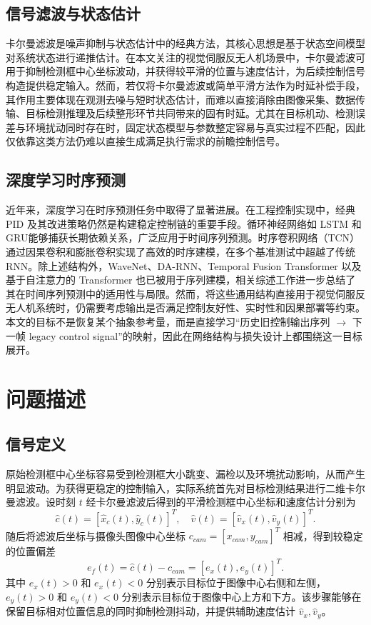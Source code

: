 \documentclass[journal]{IEEEtran}
\begin{document}
\subsection{信号滤波与状态估计}
卡尔曼滤波\cite{kalman1960new,welch1995introduction}是噪声抑制与状态估计中的经典方法，其核心思想是基于状态空间模型对系统状态进行递推估计。在本文关注的视觉伺服反无人机场景中，卡尔曼滤波可用于抑制检测框中心坐标波动，并获得较平滑的位置与速度估计，为后续控制信号构造提供稳定输入。然而，若仅将卡尔曼滤波或简单平滑方法作为时延补偿手段，其作用主要体现在观测去噪与短时状态估计，而难以直接消除由图像采集、数据传输、目标检测推理及后续整形环节共同带来的固有时延。尤其在目标机动、检测误差与环境扰动同时存在时，固定状态模型与参数整定容易与真实过程不匹配，因此仅依靠这类方法仍难以直接生成满足执行需求的前瞻控制信号。

\subsection{深度学习时序预测}
近年来，深度学习在时序预测任务中取得了显著进展\cite{lecun2015deep}。在工程控制实现中，经典 PID 及其改进策略仍然是构建稳定控制链的重要手段\cite{liu2003advancedpid}。循环神经网络如 LSTM\cite{hochreiter1997long} 和 GRU\cite{cho2014learning}能够捕获长期依赖关系，广泛应用于时间序列预测。时序卷积网络（TCN）\cite{bai2018empirical}通过因果卷积和膨胀卷积实现了高效的时序建模，在多个基准测试中超越了传统 RNN。除上述结构外，WaveNet\cite{oord2016wavenet}、DA-RNN\cite{qin2017darnn}、Temporal Fusion Transformer\cite{lim2021tft} 以及基于自注意力的 Transformer\cite{vaswani2017attention} 也已被用于序列建模，相关综述工作\cite{wen2023transformers}进一步总结了其在时间序列预测中的适用性与局限。然而，将这些通用结构直接用于视觉伺服反无人机系统时，仍需要考虑输出是否满足控制友好性、实时性和因果部署等约束。本文的目标不是恢复某个抽象参考量，而是直接学习“历史旧控制输出序列 $\rightarrow$ 下一帧 legacy control signal”的映射，因此在网络结构与损失设计上都围绕这一目标展开。

\section{问题描述}

\subsection{信号定义}
原始检测框中心坐标容易受到检测框大小跳变、漏检以及环境扰动影响，从而产生明显波动。为获得更稳定的控制输入，实际系统首先对目标检测结果进行二维卡尔曼滤波。设时刻 $t$ 经卡尔曼滤波后得到的平滑检测框中心坐标和速度估计分别为
\begin{equation}
\hat{c}(t) = [\hat{x}_c(t), \hat{y}_c(t)]^T,\quad
\hat{v}(t) = [\hat{v}_x(t), \hat{v}_y(t)]^T.
\end{equation}
随后将滤波后坐标与摄像头图像中心坐标 $c_{cam}=[x_{cam}, y_{cam}]^T$ 相减，得到较稳定的位置偏差
\begin{equation}
e_f(t) = \hat{c}(t) - c_{cam} = [e_x(t), e_y(t)]^T.
\end{equation}
其中 $e_x(t)>0$ 和 $e_x(t)<0$ 分别表示目标位于图像中心右侧和左侧，$e_y(t)>0$ 和 $e_y(t)<0$ 分别表示目标位于图像中心上方和下方。该步骤能够在保留目标相对位置信息的同时抑制检测抖动，并提供辅助速度估计 $\hat{v}_x,\hat{v}_y$。
\end{document}
